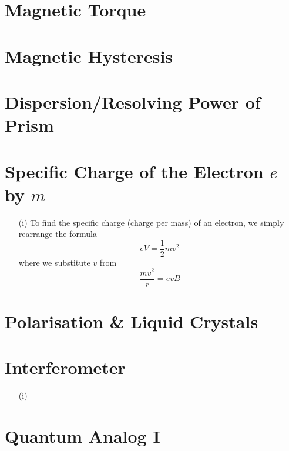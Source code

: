 \section{Magnetic Torque}

\section{Magnetic Hysteresis}

\section{Dispersion/Resolving Power of Prism}

\section{Specific Charge of the Electron $e$ by $m$}
\begin{itemize}
\item[(i)] To find the specific charge (charge per mass) of an electron, we simply rearrange the formula
\[eV=\dfrac{1}{2}mv ^2\]
where we substitute $v$ from
\[\dfrac{mv ^2}{r}=evB\]
\end{itemize}
\section{Polarisation \& Liquid Crystals}

\section{Interferometer}
\begin{itemize}
\item[(i)] 
\end{itemize}
\section{Quantum Analog I}


